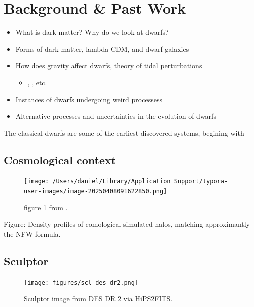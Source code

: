 \section{Background \& Past Work}\label{background-past-work}

\begin{itemize}
\tightlist
\item
  What is dark matter? Why do we look at dwarfs?
\item
  Forms of dark matter, lambda-CDM, and dwarf galaxies
\item
  How does gravity affect dwarfs, theory of tidal perturbations

  \begin{itemize}
  \tightlist
  \item
    \citet{EN2021}, \citet{PNM2008}, etc.
  \end{itemize}
\item
  Instances of dwarfs undergoing weird processess
\item
  Alternative processes and uncertainties in the evolution of dwarfs
\end{itemize}

The classical dwarfs are some of the earliest discovered systems,
begining with \citet{shapley1938}

\subsection{Cosmological context}\label{cosmological-context}

\begin{figure}
\centering
\texttt{[image: /Users/daniel/Library/Application Support/typora-user-images/image-20250408091622850.png]}
\caption[Cosmological Power Spectrum]{figure 1 from
\citet{bechtol+2022}.}
\end{figure}

Figure: Density profiles of comological simulated halos, matching
approximantly the NFW formula.

\subsection{Sculptor}\label{sculptor}

\begin{figure}
\centering
\texttt{[image: figures/scl\_des\_dr2.png]}
\caption[Picture of Sculptor]{Sculptor image from DES DR 2 via
HiPS2FITS.}\label{fig:scl_image}
\end{figure}

